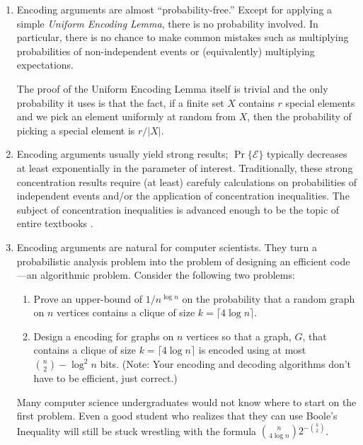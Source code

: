 \documentclass[lotsofwhite]{patmorin}
\begin{document}
\begin{enumerate}
  \item Encoding arguments are almost ``probability-free.''  Except for
  applying a simple \emph{Uniform Encoding Lemma}, there is no probability
  involved.  In particular, there is no chance to make common mistakes
  such as multiplying probabilities of non-independent events or
  (equivalently) multiplying expectations.

  The proof of the Uniform Encoding Lemma itself is trivial and the only
  probability it uses is that the fact, if a finite set $X$ contains $r$
  special elements and we pick an element uniformly at random from $X$,
  then the probability of picking a special element is $r/|X|$.

  \item Encoding arguments usually yield strong results;
  $\Pr\{\mathcal{E}\}$ typically decreases at least exponentially in
  the parameter of interest. Traditionally, these strong concentration
  results require (at least) carefuly calculations on probabilities of
  independent events and/or the application of concentration inequalities.
  The subject of concentration inequalities is advanced enough to be
  the topic of entire textbooks \cite{boucheron.lugosi.ea:concentration,dubhashi.panconesi:concentration}.
  
  \item Encoding arguments are natural for computer scientists. They
  turn a probabilistic analysis problem into the problem of designing an
  efficient code---an algorithmic problem. Consider the following 
  two problems:
    \begin{enumerate}

    \item Prove an upper-bound of $1/n^{\log n}$ on the probability that
       a random graph on $n$ vertices contains a clique of size $k=\lceil
       4\log n\rceil$.

    \item Design a encoding for graphs on $n$ vertices so that a graph,
       $G$, that contains a clique of size $k=\lceil 4\log n\rceil$
       is encoded using at most $\binom{n}{2}-\log^2 n$ bits. (Note:
       Your encoding and decoding algorithms don't have to be efficient,
       just correct.)
    \end{enumerate}
  Many computer science undergraduates would not know where to start
  on the first problem.  Even a good student who realizes that
  they can use Boole's Inequality will still be stuck
  wrestling with the formula $\binom{n}{4\log n}2^{-\binom{k}{2}}$.  
\end{enumerate}
\end{document}
